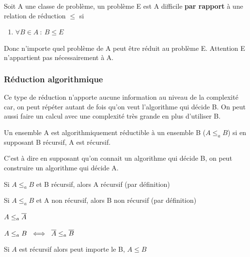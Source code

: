 \begin{mydef}[A-difficile]
	Soit A une classe de problème, un problème E est A difficile
	\textbf{par rapport} à une relation de réduction $\leq$ si 
	\begin{enumerate}
		\item $\forall B \in A \ : \ B \leq E$
	\end{enumerate}
\end{mydef}
	
\begin{myrem}
	Donc n'importe quel problème de A peut être réduit au problème E. 
	Attention E n'appartient pas nécessairement à A.
\end{myrem}


\subsubsection{Réduction algorithmique}
Ce type de réduction n'apporte aucune information au niveau de la complexité car, on 
peut répéter autant de fois qu'on veut l'algorithme qui décide B. On peut aussi 
faire un calcul avec une complexité très grande en plus d'utiliser B.

\begin{mydef}
	Un ensemble A est algorithmiquement réductible à un ensemble B 
	($A\leq_a B$) si en supposant B récursif, A est récursif.
\end{mydef}

\begin{myrem}
	C'est à dire en supposant qu'on connait un algorithme qui décide B, on 
	peut construire un algorithme qui décide A.
\end{myrem}

\begin{myprop}
	Si $A \leq_a B$ et B récursif, alors A récursif (par définition)
\end{myprop}

\begin{myprop}
	Si $A \leq_a B$ et A non récursif, alors B non récursif (par définition)
\end{myprop}

\begin{myprop}
	$A \leq_a \overline{A}$
\end{myprop}

\begin{myprop}
	$A \leq_a B \ \iff \ \overline{A} \leq_a \overline{B}$
\end{myprop}

\begin{myprop}
	Si $A$ est récursif alors peut importe le B, $A \leq B$
\end{myprop}

